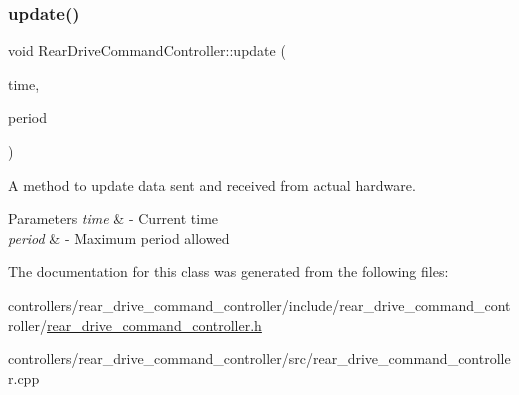 \subsubsection{\texorpdfstring{update()}{update()}}
{\footnotesize\ttfamily void Rear\+Drive\+Command\+Controller\+::update (\begin{DoxyParamCaption}\item[{const ros\+::\+Time \&}]{time,  }\item[{const ros\+::\+Duration \&}]{period }\end{DoxyParamCaption})}



A method to update data sent and received from actual hardware. 


\begin{DoxyParams}{Parameters}
{\em time} & -\/ Current time \\
\hline
{\em period} & -\/ Maximum period allowed \\
\hline
\end{DoxyParams}


The documentation for this class was generated from the following files\+:\begin{DoxyCompactItemize}
\item 
controllers/rear\+\_\+drive\+\_\+command\+\_\+controller/include/rear\+\_\+drive\+\_\+command\+\_\+controller/\hyperlink{rear__drive__command__controller_8h}{rear\+\_\+drive\+\_\+command\+\_\+controller.\+h}\item 
controllers/rear\+\_\+drive\+\_\+command\+\_\+controller/src/rear\+\_\+drive\+\_\+command\+\_\+controller.\+cpp\end{DoxyCompactItemize}
